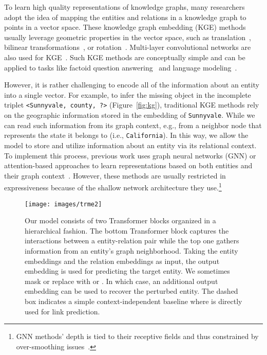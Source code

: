 \documentclass[11pt]{article}
\begin{document}
To learn high quality representations of knowledge graphs, many researchers adopt the idea of mapping the entities and relations in a knowledge graph to points in a vector space.
These knowledge graph embedding (KGE) methods usually leverage geometric properties in the vector space, such as translation~\cite{bordes2013transe}, bilinear transformations~\cite[DistMult]{yang2014distmult}, or rotation~\cite{sun2018rotate}.
Multi-layer convolutional networks are also used for KGE~\cite[ConvE]{dettmers2018conve}.
Such KGE methods are conceptually simple and can be applied to tasks like factoid question answering~\cite{saxena-etal-2020-improving} and language modeling~\cite{peters-etal-2019-knowledge}.





However, it is rather challenging to encode all of the information about an entity into a single vector.
For example, to infer the missing object in the incomplete triplet \texttt{<Sunnyvale, county, ?>} (Figure~\ref{fig:kg}), traditional KGE methods rely on the geographic information stored in the embedding of \texttt{Sunnyvale}.
While we can read such information from its graph context, e.g., from a neighbor node that represents the state it belongs to (i.e., \texttt{California}).
In this way, we allow the model to store and utilize information about an entity via its relational context.
To implement this process, previous work uses graph neural networks (GNN) or attention-based approaches to learn representations based on both entities and their graph context~\cite{kipf2016semi,bansal-etal-2019-a2n,Vashishth2020Composition}.
However, these methods are usually restricted in expressiveness because of the shallow network architecture they use.\footnote{GNN methods' depth is tied to their receptive fields and thus constrained by over-smoothing issues~\cite{liu2020towards}.}



\begin{figure*}[tb]
  \centering
  \texttt{[image: images/trme2]}
  \caption{Our model consists of two Transformer blocks organized in a hierarchical fashion. The bottom Transformer block captures the interactions between a entity-relation pair while the top one gathers information from an entity's graph neighborhood. Taking the entity embeddings  and the relation embeddings  as input, the output embedding  is used for predicting the target entity. We sometimes mask or replace  with  or . In which case, an additional output embedding  can be used to recover the perturbed entity.
  The dashed box indicates a simple context-independent baseline where  is directly used for link prediction.}
  \label{fig:model}
\end{figure*}
\end{document}
